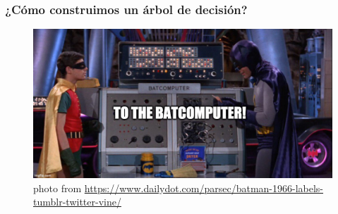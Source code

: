 \documentclass[
  shownotes,
  xcolor={svgnames},
  hyperref={colorlinks,citecolor=DarkBlue,linkcolor=andesred,urlcolor=DarkBlue}
  , aspectratio=169]{beamer}
\begin{document}
\begin{frame}[fragile]
\frametitle{¿Cómo construimos un árbol de decisión?}
\begin{figure}[H] \centering
  \centering
  \includegraphics[scale=0.35]{figures/baticomputer_meme.jpg}
  \\
  \tiny photo from \url{https://www.dailydot.com/parsec/batman-1966-labels-tumblr-twitter-vine/}
\end{figure}


\end{frame}
\end{document}
